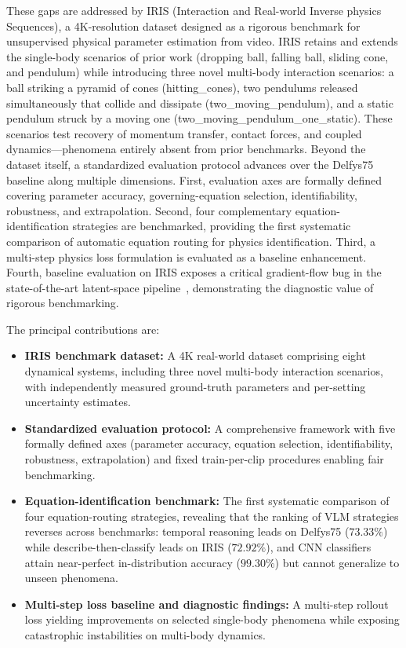 \documentclass[runningheads]{llncs}
\begin{document}
These gaps are addressed by IRIS (Interaction and Real-world Inverse physics Sequences), a 4K-resolution dataset designed as a rigorous benchmark for unsupervised physical parameter estimation from video. IRIS retains and extends the single-body scenarios of prior work (dropping ball, falling ball, sliding cone, and pendulum) while introducing three novel multi-body interaction scenarios: a ball striking a pyramid of cones (hitting\_\allowbreak{}cones), two pendulums released simultaneously that collide and dissipate (two\_\allowbreak{}moving\_\allowbreak{}pendulum), and a static pendulum struck by a moving one (two\_\allowbreak{}moving\_\allowbreak{}pendulum\_\allowbreak{}one\_\allowbreak{}static). These scenarios test recovery of momentum transfer, contact forces, and coupled dynamics---phenomena entirely absent from prior benchmarks. Beyond the dataset itself, a standardized evaluation protocol advances over the Delfys75 baseline along multiple dimensions. First, evaluation axes are formally defined covering parameter accuracy, governing-equation selection, identifiability, robustness, and extrapolation. Second, four complementary equation-identification strategies are benchmarked, providing the first systematic comparison of automatic equation routing for physics identification. Third, a multi-step physics loss formulation is evaluated as a baseline enhancement. Fourth, baseline evaluation on IRIS exposes a critical gradient-flow bug in the state-of-the-art latent-space pipeline~\cite{garcia2025learning}, demonstrating the diagnostic value of rigorous benchmarking.

The principal contributions are:

\begin{itemize}
    \item[] \textbf{IRIS benchmark dataset:} A 4K real-world dataset comprising eight dynamical systems, including three novel multi-body interaction scenarios, with independently measured ground-truth parameters and per-setting uncertainty estimates.
    \item[] \textbf{Standardized evaluation protocol:} A comprehensive framework with five formally defined axes (parameter accuracy, equation selection, identifiability, robustness, extrapolation) and fixed train-per-clip procedures enabling fair benchmarking.
    \item[] \textbf{Equation-identification benchmark:} The first systematic comparison of four equation-routing strategies, revealing that the ranking of VLM strategies reverses across benchmarks: temporal reasoning leads on Delfys75 ($73.33\%$) while describe-then-classify leads on IRIS ($72.92\%$), and CNN classifiers attain near-perfect in-distribution accuracy ($99.30\%$) but cannot generalize to unseen phenomena.
    \item[] \textbf{Multi-step loss baseline and diagnostic findings:} A multi-step rollout loss yielding improvements on selected single-body phenomena while exposing catastrophic instabilities on multi-body dynamics.
\end{itemize}
\end{document}

